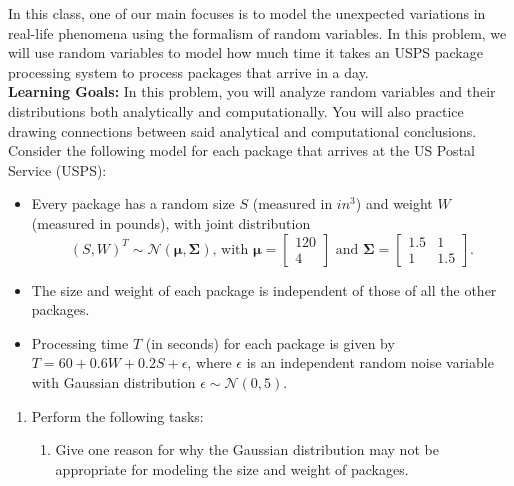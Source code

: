 \documentclass{../harvardml}
\theoremstyle{definition}
\theoremstyle{plain}
\begin{document}
\newpage 


\begin{problem}
In this class, one of our main focuses is to model the unexpected variations in real-life phenomena using the formalism of random variables. In this problem, we will use random variables to model how much time it takes an USPS package processing system to process packages that arrive in a day.\\

\noindent \textbf{Learning Goals:} In this problem, you will analyze random variables and their distributions both analytically and computationally. You will also practice drawing connections between said analytical and computational conclusions.\\

\noindent Consider the following model for each package that arrives at the US Postal Service (USPS):
\begin{itemize}
    \item Every package has a random size $S$ (measured in $in^3$) and weight $W$ (measured in pounds), with joint distribution
    $$(S, W)^{T} \sim \mathcal{N}\left( \boldsymbol{\mu}, \boldsymbol{\Sigma}\right) \text{, with } \boldsymbol{\mu} = \begin{bmatrix} 120 \\ 4 \end{bmatrix} \text{ and } \boldsymbol{\Sigma} = \begin{bmatrix} 1.5 & 1 \\ 1 & 1.5 \end{bmatrix}.$$ 
    \item The size and weight of each package is independent of those of all the other packages.
    \item Processing time $T$ (in seconds) for each package is given by $T = 60 + 0.6 W + 0.2 S + \epsilon$, where $\epsilon$ is an independent random noise variable with Gaussian distribution $\epsilon \sim \mathcal{N}(0, 5)$.
\end{itemize}

\begin{enumerate}
    \item Perform the following tasks:
    \begin{enumerate}
        \item Give one reason for why the Gaussian distribution may not be appropriate for modeling the size and weight of packages.
        

\end{enumerate}
\end{enumerate}
\end{problem}
\end{document}
